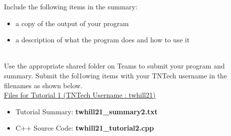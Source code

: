 \documentclass[12pt]{article}
\begin{document}
\begin{description}[labelindent=1cm]
Include the following items in the summary:
\begin{itemize}

\item a copy of the output of your program
\item a description of what the program does and how to use it

\end{itemize}


\item[\textbf{\underline{Submission on Teams:}}] \hfill \vspace{3mm}\\ 
Use the appropriate shared folder on Teams to submit your program and summary. Submit the fol1owing items with your TNTech username in the filenames as shown below. \vspace{0mm}\\

\underline{Files for Tutorial 1 (TNTech Username : twhill21)}

\begin{itemize}

\item Tutorial Summary: \textbf{ twhill21\_summary2.txt}

\item C++ Source Code: \textbf{ twhill21\_tutorial2.cpp}

\end{itemize}


\end{description}
\end{document}
